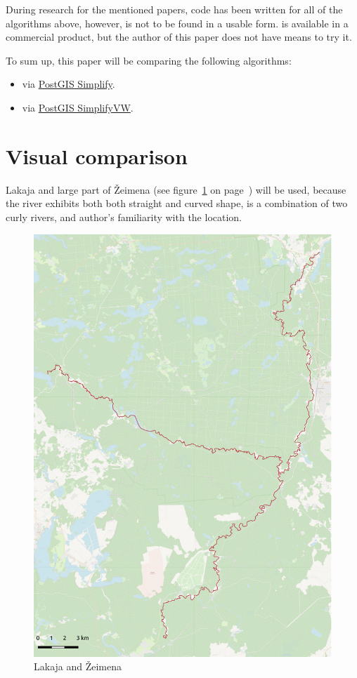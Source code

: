\documentclass[a4paper]{article}
\begin{document}
During research for the mentioned papers, code has been written for all of the
algorithms above, however, is not to be found in a usable form.
\cite{wang1998line} is available in a commercial product, but the author of
this paper does not have means to try it.

To sum up, this paper will be comparing the following algorithms:
\begin{itemize}
    \item \cite{douglas1973algorithms} via
        \href{https://postgis.net/docs/ST_Simplify.html}{PostGIS Simplify}.

    \item \cite{visvalingam1993line} via
        \href{https://postgis.net/docs/ST_SimplifyVW.html}{PostGIS SimplifyVW}.
\end{itemize}

\section{Visual comparison}

Lakaja and large part of Žeimena (see figure~\ref{fig:zeimena} on
page~\pageref{fig:zeimena}) will be used, because the river exhibits both both
straight and curved shape, is a combination of two curly rivers, and author's
familiarity with the location.

\begin{figure}[H]
    \centering
    \includegraphics[width=148mm]{zeimena-pretty}
    \caption{Lakaja and Žeimena}
    \label{fig:zeimena}
\end{figure}
\end{document}
